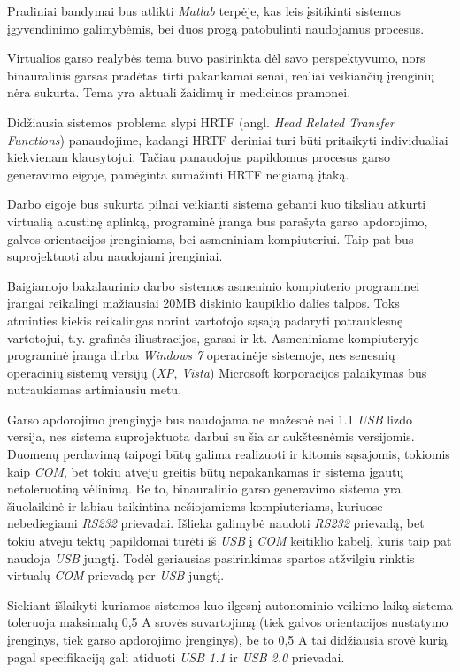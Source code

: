 \documentclass[]{vgtuef}
\begin{document}
Pradiniai bandymai bus atlikti \textit{Matlab} terpėje, kas leis įsitikinti sistemos įgyvendinimo galimybėmis, bei duos progą patobulinti naudojamus procesus.

Virtualios garso realybės tema buvo pasirinkta dėl savo perspektyvumo, nors binauralinis garsas pradėtas tirti pakankamai senai, realiai veikiančių įrenginių nėra sukurta. Tema yra aktuali žaidimų ir medicinos pramonei.

Didžiausia sistemos problema slypi HRTF (angl. \textit{Head Related Transfer Functions}) panaudojime, kadangi HRTF deriniai turi būti pritaikyti individualiai kiekvienam klausytojui. Tačiau panaudojus papildomus procesus garso generavimo eigoje, pamėginta sumažinti HRTF neigiamą įtaką.

Darbo eigoje bus sukurta pilnai veikianti sistema gebanti kuo tiksliau atkurti virtualią akustinę aplinką, programinė įranga bus parašyta garso apdorojimo, galvos orientacijos įrenginiams, bei asmeniniam kompiuteriui. Taip pat bus suprojektuoti abu naudojami įrenginiai.

Baigiamojo bakalaurinio darbo sistemos asmeninio kompiuterio programinei įrangai reikalingi mažiausiai 20MB diskinio kaupiklio dalies talpos. Toks atminties kiekis reikalingas norint vartotojo sąsają padaryti patrauklesnę vartotojui, t.y. grafinės iliustracijos, garsai ir kt. Asmeniniame kompiuteryje programinė įranga dirba \textit{Windows 7} operacinėje sistemoje, nes senesnių operacinių sistemų versijų (\textit{XP}, \textit{Vista}) Microsoft korporacijos palaikymas bus nutraukiamas artimiausiu metu.

Garso apdorojimo įrenginyje bus naudojama ne mažesnė nei 1.1 \textit{USB} lizdo versija, nes sistema suprojektuota darbui su šia ar aukštesnėmis versijomis. Duomenų perdavimą taipogi būtų galima realizuoti ir kitomis sąsajomis, tokiomis kaip \textit{COM}, bet tokiu atveju greitis būtų nepakankamas ir sistema įgautų netoleruotiną vėlinimą. Be to, binauralinio garso generavimo sistema yra šiuolaikinė ir labiau taikintina nešiojamiems kompiuteriams, kuriuose nebediegiami \textit{RS232} prievadai. Išlieka galimybė naudoti \textit{RS232} prievadą, bet tokiu atveju tektų papildomai turėti iš \textit{USB} į \textit{COM} keitiklio kabelį, kuris taip pat naudoja \textit{USB} jungtį. Todėl geriausias pasirinkimas spartos atžvilgiu rinktis virtualų \textit{COM}  prievadą per \textit{USB} jungtį.

Siekiant išlaikyti kuriamos sistemos kuo ilgesnį autonominio veikimo laiką sistema toleruoja maksimalų 0,5 A srovės suvartojimą (tiek galvos orientacijos nustatymo įrenginys, tiek garso apdorojimo įrenginys), be to 0,5 A tai didžiausia srovė kurią pagal specifikaciją gali atiduoti \textit{USB 1.1} ir \textit{USB 2.0} prievadai.
\end{document}
